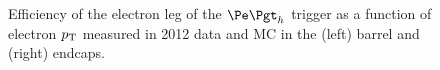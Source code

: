 \begin{figure}[htb]
\caption[Efficiency of the electron leg of the $\etau$ trigger as a function of electron $\pt$ measured
in 2012 data and MC.]{Efficiency of the electron leg of the $\etau$ trigger as a function of electron $\pt$ measured
in 2012 data and \ac{MC} in the (left) barrel and (right) endcaps.}
\label{fig:electrontrg}
\end{figure}

